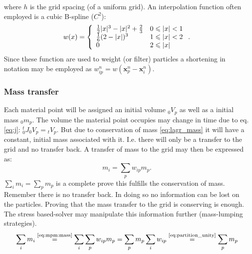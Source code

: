 \documentclass[m,times]{cgMA}
\begin{document}
where $h$ is the grid spacing (of a uniform grid). An interpolation function often employed is a cubic B-spline ($C^2$):
\begin{equation}\label{eq:cubic_weights}
  w(x) = \left\{ \begin{array} { l l } { \frac { 1 } { 2 } | x | ^ { 3 } - | x | ^ { 2 } + \frac { 2 } { 3 } } & { 0 \leqslant | x | < 1 } \\ { \frac { 1 } { 6 } ( 2 - | x | ) ^ { 3 } } & { 1 \leqslant | x | < 2 } \\ { 0 } & { 2 \leqslant | x | } \end{array} \right. .
\end{equation}
Since these function are used to weight (or filter) particles a shortening in notation may be employed as $ w_{ip}^n = w(\boldsymbol{x}_p^n-\boldsymbol{x}_i^n)$.
\cite{MPM:APIC}\cite{MPM:COURSE}\cite{steffen2008analysis}\cite{gao2017adaptive}
\subsubsection{Mass transfer}
Each material point will be assigned an initial volume $_0V_p$ as well as a initial mass $_0m_p$. The volume the material point occupies may change in time due to eq. \ref{eq:j}: ${^t_0}J _0V_p = {_tV_p}$. But due to conservation of mass \ref{eq:lagr_mass} it will have a constant, initial mass associated with it. I.e. there will only be a transfer to the grid and no transfer back.
A transfer of mass to the grid may then be expressed as:
\begin{equation}\label{eq:mpm:mass}
  m_i = \sum_p w_{ip}m_p.
\end{equation}
$\sum_i m_i =\sum_p m_p$ is a complete prove this fulfills the conservation of mass. Remember there is no transfer back. In doing so no information can be lost on the particles. Proving that the mass transfer to the grid is conserving is enough. The stress based-solver may manipulate this information further (mass-lumping strategies).
\begin{equation}
  \sum_i m_i
  \stackrel{\text{\ref{eq:mpm:mass}}}{=}
  \sum _i \sum_p w_{ip} m_p =
  \sum _p m_p \sum_i w_{ip}
  \stackrel{\text{\ref{eq:partition_unity}}}{=}
  \sum_p m_p
\end{equation}
\cite{MPM:APIC}\cite{MPM:COURSE}
\end{document}

